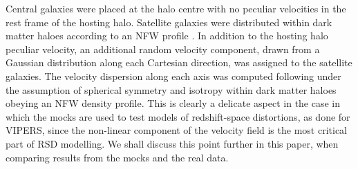 \documentclass[longauth]{aa}
\begin{document}
Central galaxies were placed at the halo centre with no peculiar velocities in the rest frame of the hosting halo.  Satellite galaxies were distributed within dark matter haloes according to an NFW profile \citep{Navarro97}. In addition to the hosting halo peculiar velocity, an additional random velocity component, drawn from a Gaussian distribution along each Cartesian direction, was assigned to the satellite galaxies. The velocity dispersion along each axis was computed following \citet{vandenbosch04} under the assumption of spherical symmetry and isotropy within dark matter haloes obeying an NFW density profile. This is clearly a delicate aspect in the case in which the mocks are used to test models of redshift-space distortions, as done for VIPERS, since the non-linear component of the velocity field is the most critical part of RSD modelling. We shall discuss this point further in this paper, when comparing results from the mocks and the real data.
\end{document}
